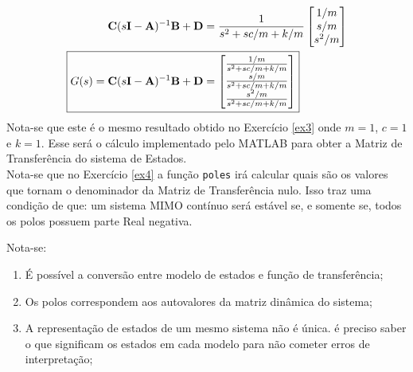 \documentclass{article}
\begin{document}
\begin{resolution}
\begin{align*}
        \mathbf{C}(s\mathbf{I} - \mathbf{A})^{-1}\mathbf{B} + \mathbf{D} &= \frac{1}{s^2 + s c/m + k/m}\begin{bmatrix} 1/m\\ s/m\\ s^2/m\end{bmatrix}\\
        \Aboxed{G(s) = \mathbf{C}(s\mathbf{I} - \mathbf{A})^{-1}\mathbf{B} + \mathbf{D} &= \begin{bmatrix} \frac{1/m}{s^2 + s c/m + k/m}\\ \frac{s/m}{s^2 + s c/m + k/m}\\ \frac{s^2/m}{s^2 + s c/m + k/m}\end{bmatrix}}
    \end{align*}
    Nota-se que este é o mesmo resultado obtido no Exercício \ref{ex3} onde $m = 1$, $c = 1$ e $k = 1$. Esse será o cálculo implementado pelo MATLAB para obter a Matriz de Transferência do sistema de Estados.\\

    Nota-se que no Exercício \ref{ex4} a função \texttt{poles} irá calcular quais são os valores que tornam o denominador da Matriz de Transferência nulo. Isso traz uma condição de que: um sistema MIMO contínuo será estável se, e somente se, todos os polos possuem parte Real negativa.
\end{resolution}

\begin{remark}\label{ex9}
    Nota-se:
    \begin{enumerate}
        \item É possível a conversão entre modelo de estados e função de transferência;
        \item Os polos correspondem aos autovalores da matriz dinâmica do sistema;
        \item A representação de estados de um mesmo sistema não é única. é preciso saber o que significam os estados em cada modelo para não cometer erros de interpretação;
    \end{enumerate}
\end{remark}
\end{document}
